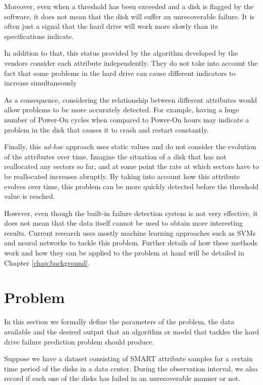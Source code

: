 Moreover, even when a threshold has been exceeded and a disk is flagged by the software, it does not mean that the disk will suffer an unrecoverable failure.
It is often just a signal that the hard drive will work more slowly than its specifications indicate.

In addition to that, this status provided by the algorithm developed by the vendors consider each attribute independently.
They do not take into account the fact that some problems in the hard drive can cause different indicators to increase simultaneously

As a consequence, considering the relationship between different attributes would allow problems to be more accurately detected.
For example, having a huge number of Power-On cycles when compared to Power-On hours may indicate a problem in the disk that causes it to crash and restart constantly.

Finally, this \textit{ad-hoc} approach uses static values and do not consider the evolution of the attributes over time.
Imagine the situation of a disk that has not reallocated any sectors so far, and at some point the rate at which sectors have to be reallocated increases abruptly.
By taking into account how this attribute evolves over time, this problem can be more quickly detected before the threshold value is reached.

However, even though the built-in failure detection system is not very effective, it does not mean that the data itself cannot be used to obtain more interesting results.
Current research uses mostly machine learning approaches such as SVMs and neural networks to tackle this problem.
Further details of how these methods work and how they can be applied to the problem at hand will be detailed in Chapter \ref{chap:background}. 

\section{Problem}\label{sec:problem}

In this section we formally define the parameters of the problem, the data available and the desired output that an algorithm or model that tackles the hard drive failure prediction problem should produce.

Suppose we have a dataset consisting of SMART attribute samples for a certain time period of the disks in a data center.
During the observation interval, we also record if each one of the disks has failed in an unrecoverable manner or not.

